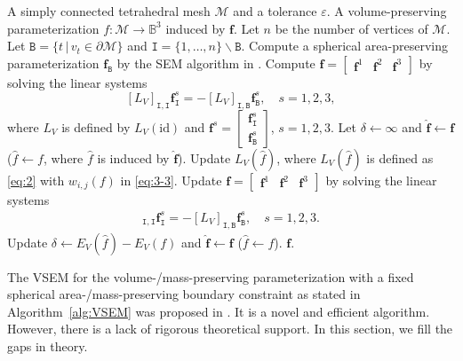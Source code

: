 \documentclass[onefignum,onetabnum]{siamonline220329}
\numberwithin{equation}{section}
\begin{document}
\begin{sloppypar}
\begin{algorithm}
\caption{VSEM for the volume-preserving parameterization} \label{alg:VSEM}
\begin{algorithmic}[1]
\Require A simply connected tetrahedral mesh $\mathcal{M}$ and a tolerance $\varepsilon$.
\Ensure A volume-preserving parameterization $f:\mathcal{M}\to\mathbb{B}^3$ induced by $\mathbf{f}$.
\State Let $n$ be the number of vertices of $\mathcal{M}$.
\State Let $\mathtt{B} = \{t \,|\, v_t\in\partial\mathcal{M}\}$ and $\mathtt{I} = \{1, \ldots, n\} \backslash\mathtt{B}$.
\State Compute a spherical area-preserving parameterization $\mathbf{f}_\mathtt{B}$ by the SEM algorithm in \cite{YuLL19}.
\State Compute $\mathbf{f} = \begin{bmatrix}\mathbf{f}^1 & \mathbf{f}^2 & \mathbf{f}^3\end{bmatrix}$ by solving the linear systems
\[
[L_{{V}}]_{\mathtt{I},\mathtt{I}} \mathbf{f}_\mathtt{I}^{s} = -[L_{{V}}]_{\mathtt{I},\mathtt{B}} \mathbf{f}_\mathtt{B}^{s}, 
\quad s = 1,2,3,
\]
where $L_{{V}}$ is defined by $L_{{V}}(\mathrm{id})$ and $\mathbf{f}^s = \begin{bmatrix}
\mathbf{f}^s_{\mathtt{I}}\\
\mathbf{f}^s_{\mathtt{B}}
\end{bmatrix}$, $s=1,2,3$.
\State Let $\delta\gets \infty$ and $\widehat{\mathbf{f}}\gets\mathbf{f}$ ($\widehat{f}\gets f$, where $\widehat{f}$ is induced by $\widehat{\mathbf{f}}$).
\While{$\delta>\varepsilon$}
\State Update $L_{{V}}(\widehat{f})$, where $L_{{V}}(\widehat{f})$ is defined as \eqref{eq:2} with $w_{i,j}(f)$ in \eqref{eq:3-3}.
\State Update $\mathbf{f}=\begin{bmatrix}\mathbf{f}^1 & \mathbf{f}^2 & \mathbf{f}^3\end{bmatrix}$ by solving the linear systems \label{alg:Lap_LS}
\begin{align*}
[L_{{V}}]_{\mathtt{I},\mathtt{I}} \mathbf{f}_\mathtt{I}^{s} = -[L_{{V}}]_{\mathtt{I},\mathtt{B}} \mathbf{f}_\mathtt{B}^{s}, 
\quad s=1,2,3.
\end{align*}
\State Update $\delta \gets E_{{V}}(\widehat{f})-E_{{V}}(f)$ and $\widehat{\mathbf{f}}\gets \mathbf{f}$ ($\widehat{f}\gets f$).
\EndWhile
\State \Return $\mathbf{f}$.
\end{algorithmic}
\end{algorithm}

The VSEM for the volume-/mass-preserving parameterization with a fixed spherical area-/mass-preserving boundary constraint as stated in Algorithm~\ref{alg:VSEM} was proposed in \cite{YuLL19}. It is a novel and efficient algorithm. However, there is a lack of rigorous theoretical support. In this section, we fill the gaps in theory.


\end{sloppypar}
\end{document}
